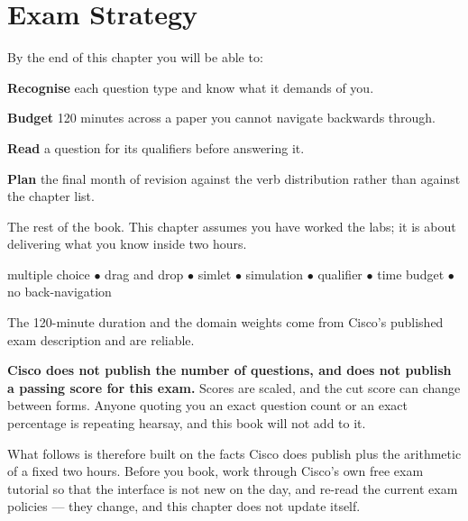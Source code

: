 \chapter{Exam Strategy}\label{ch:examstrategy}

\begin{outcomes}
By the end of this chapter you will be able to:
\begin{tight}
  \item \textbf{Recognise} each question type and know what it demands of you.
  \item \textbf{Budget} 120 minutes across a paper you cannot navigate backwards
        through.
  \item \textbf{Read} a question for its qualifiers before answering it.
  \item \textbf{Plan} the final month of revision against the verb distribution
        rather than against the chapter list.
\end{tight}
\end{outcomes}

\begin{prereq}
The rest of the book. This chapter assumes you have worked the labs; it is about
delivering what you know inside two hours.
\end{prereq}

\begin{keyterms}
multiple choice $\bullet$ drag and drop $\bullet$ simlet $\bullet$ simulation
$\bullet$ qualifier $\bullet$ time budget $\bullet$ no back-navigation
\end{keyterms}

\begin{alertbox}
The 120-minute duration and the domain weights come from Cisco's published exam
description and are reliable.

\textbf{Cisco does not publish the number of questions, and does not publish a
passing score for this exam.} Scores are scaled, and the cut score can change
between forms. Anyone quoting you an exact question count or an exact percentage
is repeating hearsay, and this book will not add to it.

What follows is therefore built on the facts Cisco does publish plus the
arithmetic of a fixed two hours. Before you book, work through Cisco's own free
exam tutorial so that the interface is not new on the day, and re-read the
current exam policies --- they change, and this chapter does not update itself.
\end{alertbox}

